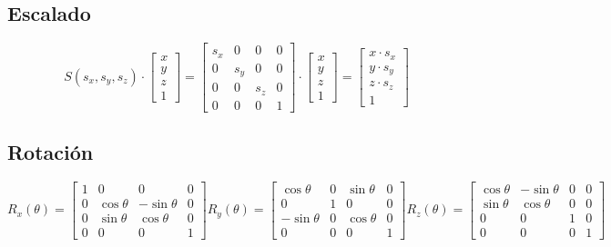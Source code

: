 \subsection{Escalado}
$$S(s_x, s_y, s_z) \cdot
\left[\begin{matrix}
x \\ y \\ z \\ 1
\end{matrix}\right] = 
\left[\begin{matrix}
s_x & 0 & 0 & 0 \\ 0 & s_y & 0 & 0 \\ 0 & 0 & s_z & 0 \\ 0 & 0 & 0 & 1
\end{matrix}\right] \cdot
\left[\begin{matrix}
x \\ y \\ z \\ 1
\end{matrix}\right] = 
\left[\begin{matrix}
x\cdot s_x \\ y\cdot s_y \\ z\cdot s_z \\ 1
\end{matrix}\right]$$

\subsection{Rotación}
$$R_x(\theta)=\left[\begin{matrix}
1 & 0 & 0 & 0 \\ 
0 & \cos \theta & - \sin \theta & 0 \\ 
0 & \sin \theta & \cos \theta & 0 \\ 
0 & 0 & 0 & 1
\end{matrix}\right]
R_y(\theta)=\left[\begin{matrix}
\cos \theta & 0 & \sin \theta & 0 \\ 
0 & 1 & 0 & 0 \\ 
- \sin \theta & 0 & \cos \theta & 0 \\ 
0 & 0 & 0 & 1
\end{matrix}\right]
R_z(\theta)=\left[\begin{matrix}
\cos \theta & -\sin \theta & 0 & 0 \\ 
\sin \theta & \cos \theta & 0 & 0 \\ 
0 & 0 & 1 & 0 \\
0 & 0 & 0 & 1
\end{matrix}\right]$$

